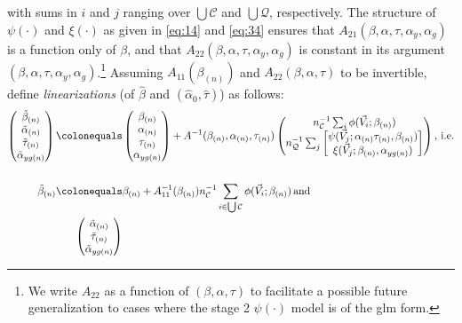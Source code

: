 \documentclass{article}
\newcommand{\defeq}{\ensuremath{\colonequals}}
\begin{document}
with sums in $i$ and $j$ ranging over $\bigcup \mathcal{C}$ and $\bigcup\mathcal{Q}$, respectively.
The structure of $\psi(\cdot)$ and $\xi(\cdot)$ as given in \eqref{eq:14} and \eqref{eq:34} ensures
that $A_{21}(\beta, \alpha, \tau, \alpha_{y}, \alpha_{g})$ is a function only of $\beta$, and that $A_{22}(\beta, \alpha, \tau, \alpha_{y}, \alpha_{g})$ is constant in its argument $(\beta, \alpha, \tau, \alpha_{y}, \alpha_{g})$.\footnote{We write $A_{22}$  as a function of $(\beta, \alpha, \tau)$ to facilitate a possible future generalization to cases where the stage 2 $\psi(\cdot)$ model is of the glm form.}  Assuming $A_{11}(\beta_{(n)})$ and $A_{22}(\beta, \alpha, \tau)$ to be invertible, define \textit{linearizations} (of
$\hat\beta$ and $(\hat{\alpha}_{0}, \hat\tau)$) as follows:
  \begin{align}
    \begin{pmatrix}\tilde{\beta}_{(n)}\\\tilde{\alpha}_{(n)}\\ \tilde{\tau}_{(n)} \\ \tilde{\alpha}_{yg(n)}\end{pmatrix}
    \defeq& \begin{pmatrix}\beta_{(n)} \\\alpha_{(n)}\\
                    \tau_{(n)}\\ \alpha_{yg(n)} \end{pmatrix}
    + A^{-1}(\beta_{(n)}, \alpha_{(n)}, \tau_{(n)})\begin{pmatrix}
      n_{\mathcal{C}}^{-1}\sum_{i%
      }\phi(\vec{V}_{i}; \beta_{(n)})\\
      n_{\mathcal{Q}}^{-1}\sum_{j%
                 }\begin{bmatrix}\psi(\vec{V}_{j};
                   \alpha_{(n)}\tau_{(n)},\beta_{(n)} )\\
                   \xi(\vec{V}_{j}; \beta_{(n)},\alpha_{yg(n)})\end{bmatrix}
      \\
    \end{pmatrix},\, \text{i.e.} \nonumber \\
   \nonumber \\
       \tilde{\beta}_{(n)}
    \defeq& \beta_{(n)} + A_{11}^{-1}(\beta_{(n)})n_{\mathcal{C}}^{-1}\sum_{i\in \bigcup \mathcal{C}}\phi(\vec{V}_{i}; \beta_{(n)})
  \, \text{and} \nonumber\\
    \begin{pmatrix}\tilde{\alpha}_{(n)}\\ \tilde{\tau}_{(n)}\\ \tilde{\alpha}_{yg(n)} \end{pmatrix}

\end{align}
\end{document}
